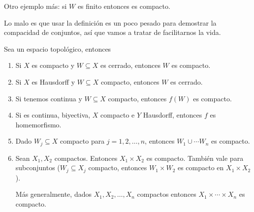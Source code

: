 \documentclass{apuntes}
\begin{document}
Otro ejemplo más: si $W$ es finito entonces es compacto.

Lo malo es que usar la definición es un poco pesado para demostrar la compacidad de conjuntos, así que vamos a tratar de facilitarnos la vida.

\begin{prop} Sea \tops un espacio topológico, entonces
\begin{enumerate}
	\item Si $X$ es compacto y $W⊆X$ es cerrado, entonces $W$ es compacto.
	\item Si $X$ es Hausdorff y $W⊆X$ compacto, entonces $W$ es cerrado.
	\item Si tenemos \stdf continua y $W⊆X$ compacto, entonces $f(W)$ es compacto.
	\item Si \stdf es continua, biyectiva, $X$ compacto e $Y$ Hausdorff, entonces $f$ es homemorfismo.
	\item Dado $W_j⊆X$ compacto para $j=1,2,\dotsc, n$, entonces $W_1 ∪ \dotsb W_n$ es compacto.
	\item Sean $X_1, X_2$ compactos. Entonces $X_1×X_2$ es compacto. También vale para subconjuntos ($W_j ⊆ X_j$ compacto, entonces $W_1 × W_2$ es compacto en $X_1×X_2$).

	Más generalmente, dados $X_1,X_2,\dotsc, X_n$ compactos entonces $X_1 × \dotsb × X_n$ es compacto.
\end{enumerate} \label{propCompactos}
\end{prop}
\end{document}
